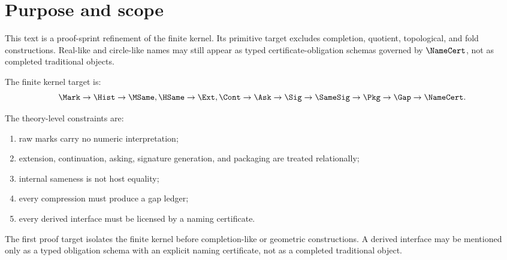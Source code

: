 \section{Purpose and scope}

This text is a proof-sprint refinement of the finite kernel.  Its primitive target excludes completion, quotient, topological, and fold constructions.  Real-like and circle-like names may still appear as typed certificate-obligation schemas governed by $\NameCert$, not as completed traditional objects.

The finite kernel target is:
$$
\Mark\to\Hist\to\MSame,\HSame\to\Ext,\Cont\to\Ask\to\Sig\to\SameSig\to\Pkg\to\Gap\to\NameCert.
$$

The theory-level constraints are:
\begin{enumerate}[label=(\roman*)]
\item raw marks carry no numeric interpretation;
\item extension, continuation, asking, signature generation, and packaging are treated relationally;
\item internal sameness is not host equality;
\item every compression must produce a gap ledger;
\item every derived interface must be licensed by a naming certificate.
\end{enumerate}

\begin{principle}
The first proof target isolates the finite kernel before completion-like or geometric constructions.  A derived interface may be mentioned only as a typed obligation schema with an explicit naming certificate, not as a completed traditional object.
\end{principle}
